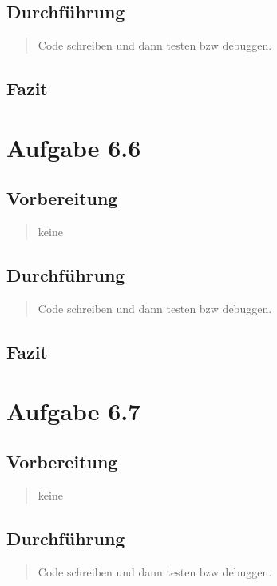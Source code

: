 \subsection{Durchführung}
\begin{quote}
	Code schreiben und dann testen bzw debuggen.
\end{quote}
\subsection{Fazit}
\begin{quote}
	
\end{quote}

\section{Aufgabe 6.6}
\subsection{Vorbereitung}
\begin{quote}
	keine
\end{quote}
\subsection{Durchführung}
\begin{quote}
	Code schreiben und dann testen bzw debuggen.
\end{quote}
\subsection{Fazit}
\begin{quote}
	
\end{quote}

\section{Aufgabe 6.7}
\subsection{Vorbereitung}
\begin{quote}
	keine
\end{quote}
\subsection{Durchführung}
\begin{quote}
	Code schreiben und dann testen bzw debuggen.
\end{quote}
